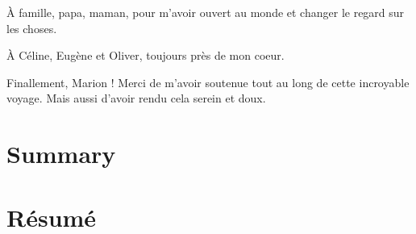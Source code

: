 À famille, papa, maman, pour m'avoir ouvert au monde et changer le regard sur les choses.

À Céline, Eugène et Oliver, toujours près de mon coeur. %

Finallement, Marion ! Merci de m'avoir soutenue tout au long de cette incroyable voyage. Mais aussi d'avoir rendu cela serein et doux. 
 
 \chapter*{Summary} 
 
 \chapter*{Résumé} 
 
